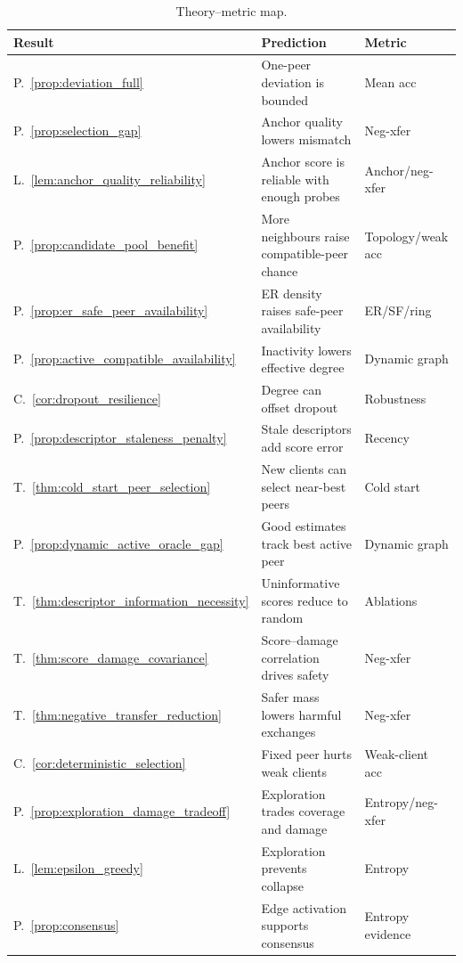 \documentclass[conference]{IEEEtran}
\begin{document}
\begin{table}[t]
\centering
\caption{Theory--metric map.}
\label{tab:theory_practice}
\tiny
\renewcommand{\arraystretch}{0.98}
\setlength{\tabcolsep}{1.5pt}
\begin{tabular}{p{}p{}p{}}
\toprule
\textbf{Result} & \textbf{Prediction} & \textbf{Metric} \\
\midrule
P.~\ref{prop:deviation_full} & One-peer deviation is bounded & Mean acc \\
P.~\ref{prop:selection_gap} & Anchor quality lowers mismatch & Neg-xfer \\
L.~\ref{lem:anchor_quality_reliability} & Anchor score is reliable with enough probes & Anchor/neg-xfer \\
P.~\ref{prop:candidate_pool_benefit} & More neighbours raise compatible-peer chance & Topology/weak acc \\
P.~\ref{prop:er_safe_peer_availability} & ER density raises safe-peer availability & ER/SF/ring \\
P.~\ref{prop:active_compatible_availability} & Inactivity lowers effective degree & Dynamic graph \\
C.~\ref{cor:dropout_resilience} & Degree can offset dropout & Robustness \\
P.~\ref{prop:descriptor_staleness_penalty} & Stale descriptors add score error & Recency \\
T.~\ref{thm:cold_start_peer_selection} & New clients can select near-best peers & Cold start \\
P.~\ref{prop:dynamic_active_oracle_gap} & Good estimates track best active peer & Dynamic graph \\
T.~\ref{thm:descriptor_information_necessity} & Uninformative scores reduce to random & Ablations \\
T.~\ref{thm:score_damage_covariance} & Score--damage correlation drives safety & Neg-xfer \\
T.~\ref{thm:negative_transfer_reduction} & Safer mass lowers harmful exchanges & Neg-xfer \\
C.~\ref{cor:deterministic_selection} & Fixed peer hurts weak clients & Weak-client acc \\
P.~\ref{prop:exploration_damage_tradeoff} & Exploration trades coverage and damage & Entropy/neg-xfer \\
L.~\ref{lem:epsilon_greedy} & Exploration prevents collapse & Entropy \\
P.~\ref{prop:consensus} & Edge activation supports consensus & Entropy evidence \\

\end{tabular}
\end{table}
\end{document}
